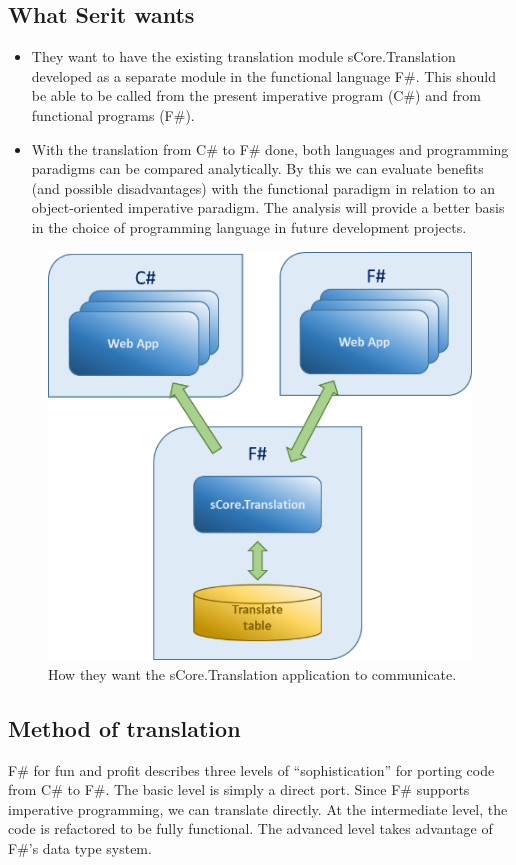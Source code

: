 \documentclass[12pt, a4paper]{article}
\begin{document}
\newpage
\subsection{What Serit wants}

\begin{itemize}
	\item They want to have the existing translation module sCore.Translation developed as a separate module in the functional language F\#. This should be able to be called from the present imperative program (C\#) and from functional programs (F\#).
	\item With the translation from C\# to F\# done, both languages and programming paradigms can be compared analytically. By this we can evaluate benefits (and possible disadvantages) with the functional paradigm in relation to an object-oriented imperative paradigm. The analysis will provide a better basis in the choice of programming language in future development projects.
\end{itemize}

\begin{figure}[!h]
    \includegraphics[scale=0.5]{image02}
    \centering
    \caption{How they want the sCore.Translation application to communicate.}
\end{figure}

\newpage
\subsection{Method of translation}
F\# for fun and profit describes three levels of “sophistication” for porting code from C\# to F\#. The basic level is simply a direct port. Since F\# supports imperative programming, we can translate directly. At the intermediate level, the code is refactored to be fully functional. The advanced level takes advantage of F\#’s data type system.\\
\end{document}
